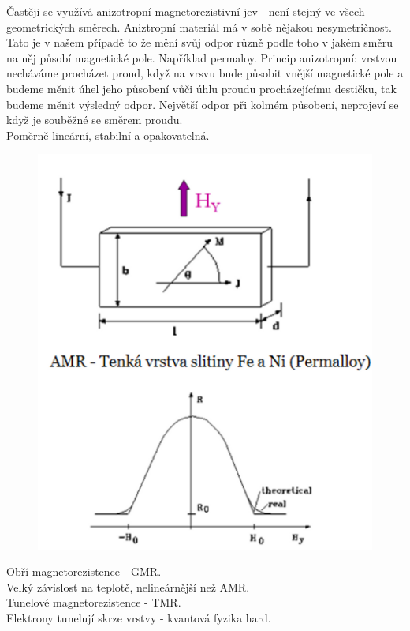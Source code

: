 Častěji se využívá anizotropní magnetorezistivní jev - není stejný ve všech geometrických směrech. Aniztropní materiál má v sobě nějakou nesymetričnost. Tato je v našem případě to že mění svůj odpor různě podle toho v jakém směru na něj působí magnetické pole. Například permaloy.
Princip anizotropní: vrstvou necháváme procházet proud, když na vrsvu bude působit vnější magnetické pole a budeme měnit úhel jeho působení vůči úhlu proudu procházejícímu destičku, tak budeme měnit výsledný odpor. Největší odpor při kolmém působení, neprojeví se když je souběžné se směrem proudu.\\
Poměrně lineární, stabilní a opakovatelná.\\
\begin{figure}[h!]
    \centering
    \includegraphics[scale = 0.1]{img/AnizoMag.png}
\end{figure}
Obří magnetorezistence - GMR.\\
Velký závislost na teplotě, nelineárnější než AMR.\\
Tunelové magnetorezistence - TMR.\\
Elektrony tunelují skrze vrstvy - kvantová fyzika hard.\\
